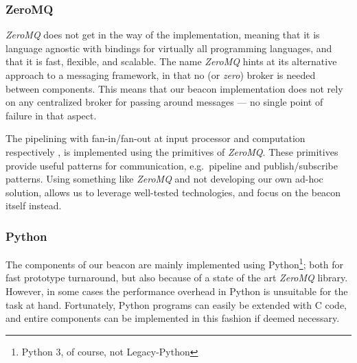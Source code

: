 \subsubsection{ZeroMQ}
\textit{ZeroMQ} does not get in the way of the implementation, meaning that it is language agnostic with bindings for virtually all programming languages, and that it is fast, flexible, and scalable.
The name \textit{ZeroMQ} hints at its alternative approach to a messaging framework, in that no (or \textit{zero}) broker is needed between components.
This means that our beacon implementation does not rely on any centralized broker for passing around messages --- no single point of failure in that aspect.

The pipelining with fan-in/fan-out at input processor and computation respectively , is implemented using the primitives of \textit{ZeroMQ}.
These primitives provide useful patterns for communication, e.g.\ pipeline and publish/subscribe patterns.
Using something like \textit{ZeroMQ} and not developing our own ad-hoc solution, allows us to leverage well-tested technologies, and focus on the beacon itself instead.

\subsubsection{Python}
The components of our beacon are mainly implemented using Python\footnote{Python 3, of course, not Legacy-Python}; both for fast prototype turnaround, but also because of a state of the art \textit{ZeroMQ} library.
However, in some cases the performance overhead in Python is unsuitable for the task at hand.
Fortunately, Python programs can easily be extended with C code, and entire components can be implemented in this fashion if deemed necessary.
